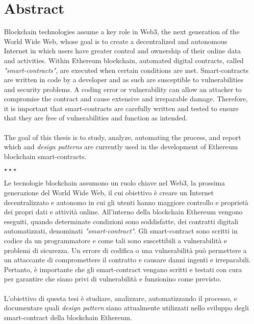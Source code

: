\chapter*{Abstract}\label{abstract}
Blockchain technologies assume a key role in Web3, the next generation of the World Wide Web, whose goal is to create a decentralized and autonomous Internet in which users have greater control and ownership of their online data and activities. Within Ethereum blockchain, automated digital contracts, called \textit{"smart-contracts"}, are executed when certain conditions are met. Smart-contracts are written in code by a developer and as such are susceptible to vulnerabilities and security problems. A coding error or vulnerability can allow an attacker to compromise the contract and cause extensive and irreparable damage. Therefore, it is important that smart-contracts are carefully written and tested to ensure that they are free of vulnerabilities and function as intended.\\
\\
The goal of this thesis is to study, analyze, automating the process, and report which and \textit{design patterns} are currently used in the development of Ethereum blockchain smart-contracts.
\vspace{20pt}
\begin{center}
\large$\star\star\star$
\end{center}
\vspace{20pt}
Le tecnologie blockchain assumono un ruolo chiave nel Web3, la prossima generazione del World Wide Web, il cui obiettivo è creare un Internet decentralizzato e autonomo in cui gli utenti hanno maggiore controllo e proprietà dei propri dati e attività online. All'interno della blockchain Ethereum vengono eseguiti, quando determinate condizioni sono soddisfatte, dei contratti digitali automatizzati, denominati \textit{"smart-contract"}. Gli smart-contract sono scritti in codice da un programmatore e come tali sono suscettibili a vulnerabilità e problemi di sicurezza. Un errore di codifica o una vulnerabilità può permettere a un attaccante di compromettere il contratto e causare danni ingenti e irreparabili. Pertanto, è importante che gli smart-contract vengano scritti e testati con cura per garantire che siano privi di vulnerabilità e funzionino come previsto.\\
\\
L'obiettivo di questa tesi è studiare, analizzare, automatizzando il processo, e documentare quali \textit{design pattern} siano attualmente utilizzati nello sviluppo degli smart-contract della blockchain Ethereum.
 
